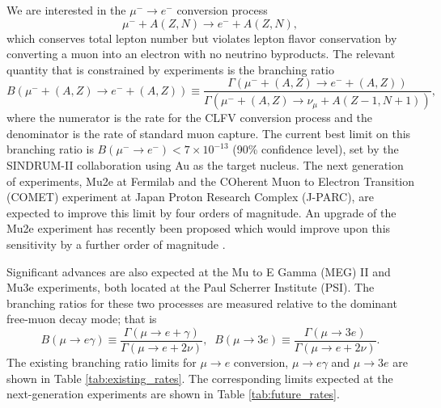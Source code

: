 \documentclass{book}[12pt]
\begin{document}
We are interested in the $\mu^-\rightarrow e^-$ conversion process
\begin{equation}
\mu^-+A(Z,N)\rightarrow e^- + A(Z,N),
\end{equation}
which conserves total lepton number but violates lepton flavor conservation by converting a muon into an electron with no neutrino byproducts. The relevant quantity that is constrained by experiments is the branching ratio
\begin{equation}
B(\mu^-+(A,Z)\rightarrow e^- + (A,Z))\equiv\frac{\Gamma(\mu^-+(A,Z)\rightarrow e^-+(A,Z))}{\Gamma(\mu^-+(A,Z)\rightarrow\nu_{\mu}+A(Z-1,N+1))},
\end{equation}
where the numerator is the rate for the CLFV conversion process and the denominator is the rate of standard muon capture. The current best limit on this branching ratio is $B(\mu^-\rightarrow e^-)<7\times 10^{-13}$ (90\% confidence level), set by the SINDRUM-II collaboration \citep{Bertl2006} using Au as the target nucleus. The next generation of experiments, Mu2e at Fermilab\citep{Bernstein_2019} and the COherent Muon to Electron Transition (COMET) experiment \citep{10.3389/fphy.2018.00133} at Japan Proton Research Complex (J-PARC), are expected to improve this limit by four orders of magnitude. An upgrade of the Mu2e experiment has recently been proposed which would improve upon this sensitivity by a further order of magnitude \cite{Mu2e:2018osu}.

Significant advances are also expected at the Mu to E Gamma (MEG) II and Mu3e experiments, both located at the Paul Scherrer Institute (PSI). The branching ratios for these two processes are measured relative to the dominant free-muon decay mode; that is
\begin{equation}
B(\mu\rightarrow e\gamma)\equiv\frac{\Gamma\left(\mu\rightarrow e+\gamma\right)}{\Gamma\left(\mu\rightarrow e+2\nu\right)},\;\;B(\mu\rightarrow 3e)\equiv\frac{\Gamma\left(\mu\rightarrow 3e\right)}{\Gamma\left(\mu\rightarrow e+2\nu\right)}.
\end{equation} 
The existing branching ratio limits for $\mu\rightarrow e$ conversion, $\mu\rightarrow e\gamma$ and $\mu\rightarrow 3e$ are shown in Table \ref{tab:existing_rates}. The corresponding limits expected at the next-generation experiments are shown in Table \ref{tab:future_rates}. 
\end{document}

